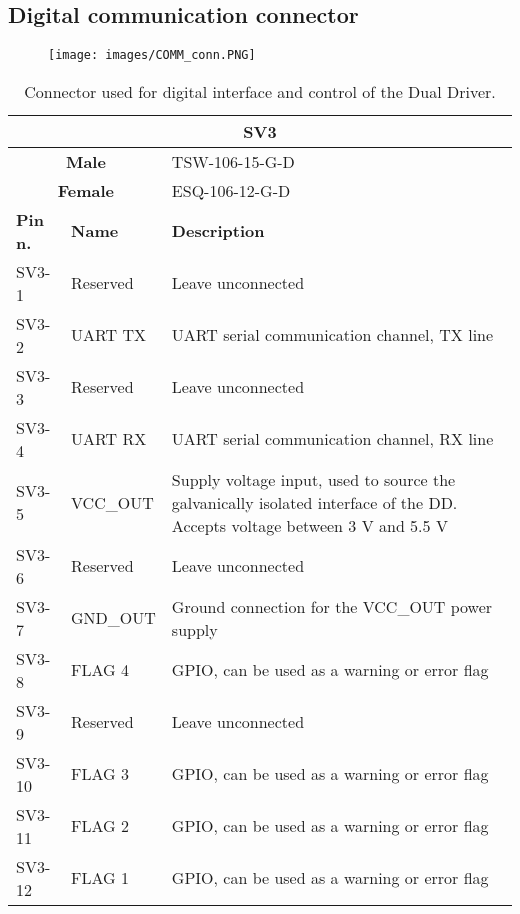 \subsection{Digital communication connector}

\begin{figure}[h]
    \centering
    \texttt{[image: images/COMM\_conn.PNG]}
    \label{SV3}
\end{figure}

\begin{table}[H]
    \begin{center}
        \begin{tabular}{
        |p{2cm}
        |>{\centering\arraybackslash}p{2cm}
        |>{\centering\arraybackslash}p{10cm}
        |  }
        \hline
            \multicolumn{3}{|c|}{\textbf{SV3}}  \\
        \hline
        \hline
            \multicolumn{2}{|c|}{\textbf{Male}}  & TSW-106-15-G-D\\
        \hline
            \multicolumn{2}{|c|}{\textbf{Female}}  & ESQ-106-12-G-D\\
        \hline
        \hline
            \textbf{Pin n.} & \textbf{Name} & \textbf{Description}\\
        \hline
            SV3-1 & Reserved & Leave unconnected \\
        \hline
            SV3-2 & UART TX & UART serial communication channel, TX line \\
        \hline
            SV3-3 & Reserved &  Leave unconnected \\
        \hline 
            SV3-4 & UART RX & UART serial communication channel, RX line \\
        \hline
            SV3-5 & VCC\_OUT & Supply voltage input, used to source the galvanically isolated interface of the DD. \newline
            Accepts voltage between 3 V and 5.5 V \\
        \hline
            SV3-6 & Reserved & Leave unconnected \\
        \hline
            SV3-7 & GND\_OUT & Ground connection for the VCC\_OUT power supply \\
        \hline
            SV3-8 & FLAG 4 & GPIO, can be used as a warning or error flag \\
        \hline
            SV3-9 & Reserved & Leave unconnected \\
        \hline
            SV3-10 & FLAG 3 & GPIO, can be used as a warning or error flag \\
        \hline
            SV3-11 & FLAG 2 & GPIO, can be used as a warning or error flag \\
        \hline
            SV3-12 & FLAG 1 & GPIO, can be used as a warning or error flag \\
        \hline
        \end{tabular}
    \caption{Connector used for digital interface and control of the Dual Driver.}
    \end{center}
\end{table}



